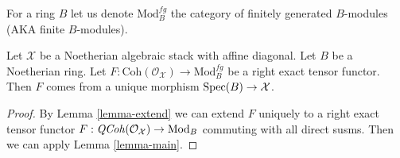 \noindent
For a ring $B$ let us denote $\text{Mod}^{fg}_B$ the category of
finitely generated $B$-modules (AKA finite $B$-modules).

\begin{theorem}
\label{theorem-main}
Let $\mathcal{X}$ be a Noetherian algebraic stack with affine diagonal.
Let $B$ be a Noetherian ring.
Let $F : \text{Coh}(\mathcal{O}_\mathcal{X}) \to \text{Mod}^{fg}_B$
be a right exact tensor functor.
Then $F$ comes from a unique morphism $\mathop{\mathrm{Spec}}(B) \to \mathcal{X}$.
\end{theorem}

\begin{proof}
By Lemma \ref{lemma-extend}
we can extend $F$ uniquely to a right exact tensor functor
$F : \mathit{QCoh}(\mathcal{O}_\mathcal{X}) \to \text{Mod}_B$
commuting with all direct susms. Then we can apply
Lemma \ref{lemma-main}.
\end{proof}

















